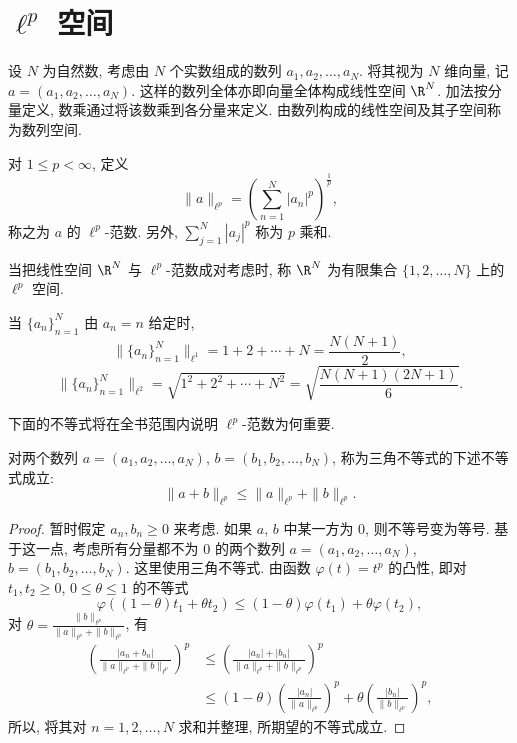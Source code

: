 \section{\texorpdfstring{$\ell^{p}$ 空间}{ellp 空间}}\label{sec:1.1}




设 $N$ 为自然数, 考虑由 $N$ 个实数组成的数列 $a_{1}, a_{2}, \ldots, a_{N}$. 将其视为 $N$ 维向量, 记 $a = (a_{1}, a_{2}, \ldots, a_{N})$. 这样的数列全体亦即向量全体构成线性空间 $\R^{N}$. 加法按分量定义, 数乘通过将该数乘到各分量来定义. 由数列构成的线性空间及其子空间称为数列空间.

\begin{definition}\label{def:1.1}
对 $1 \leq p < \infty$, 定义
\[
\| a \|_{\ell^{p}} = \left(\sum_{n=1}^{N} |a_{n}|^{p}\right)^{\frac{1}{p}},
\]
称之为 $a$ 的 $\ell^{p}$-范数. 另外, $\sum_{j=1}^{N} |a_{j}|^{p}$ 称为 $p$ 乘和.

当把线性空间 $\R^{N}$ 与 $\ell^{p}$-范数成对考虑时, 称 $\R^{N}$ 为有限集合 $\{1, 2, \ldots, N\}$ 上的 $\ell^{p}$ 空间.
\end{definition}

\begin{example}\label{exa:1.1}
当 $\{a_{n}\}_{n=1}^{N}$ 由 $a_{n} = n$ 给定时,
\[
\| \{a_{n}\}_{n=1}^{N} \|_{\ell^{1}} = 1 + 2 + \cdots + N = \frac{N(N+1)}{2},
\]
\[
\| \{a_{n}\}_{n=1}^{N} \|_{\ell^{2}} = \sqrt{1^{2} + 2^{2} + \cdots + N^{2}} = \sqrt{\frac{N(N+1)(2N+1)}{6}}.
\]
\end{example}

下面的不等式将在全书范围内说明 $\ell^{p}$-范数为何重要.

\begin{theorem}\label{thm:1.1}
对两个数列 $a = (a_{1}, a_{2}, \ldots, a_{N})$, $b = (b_{1}, b_{2}, \ldots, b_{N})$, 称为三角不等式的下述不等式成立:
\[
\|a + b\|_{\ell^{p}} \leq \|a\|_{\ell^{p}} + \|b\|_{\ell^{p}}.
\]
\end{theorem}

\begin{proof}
暂时假定 $a_{n}, b_{n} \geq 0$ 来考虑. 如果 $a$, $b$ 中某一方为 $0$, 则不等号变为等号. 基于这一点, 考虑所有分量都不为 $0$ 的两个数列 $a = (a_{1}, a_{2}, \ldots, a_{N})$, $b = (b_{1}, b_{2}, \ldots, b_{N})$. 这里使用三角不等式. 由函数 $\varphi(t) = t^{p}$ 的凸性, 即对 $t_{1}, t_{2} \geq 0$, $0 \leq \theta \leq 1$ 的不等式
\[
\varphi((1-\theta)t_{1} + \theta t_{2}) \leq (1-\theta)\varphi(t_{1}) + \theta\varphi(t_{2}),
\]
对 $\theta = \frac{\|b\|_{\ell^{p}}}{\|a\|_{\ell^{p}} + \|b\|_{\ell^{p}}}$, 有
\begin{align*}
\left(\frac{|a_{n} + b_{n}|}{\|a\|_{\ell^{p}} + \|b\|_{\ell^{p}}}\right)^{p} & \leq \left(\frac{|a_{n}| + |b_{n}|}{\|a\|_{\ell^{p}} + \|b\|_{\ell^{p}}}\right)^{p} \\
& \leq (1-\theta)\left(\frac{|a_{n}|}{\|a\|_{\ell^{p}}}\right)^{p} + \theta\left(\frac{|b_{n}|}{\|b\|_{\ell^{p}}}\right)^{p},
\end{align*}
所以, 将其对 $n = 1, 2, \ldots, N$ 求和并整理, 所期望的不等式成立.
\end{proof}

